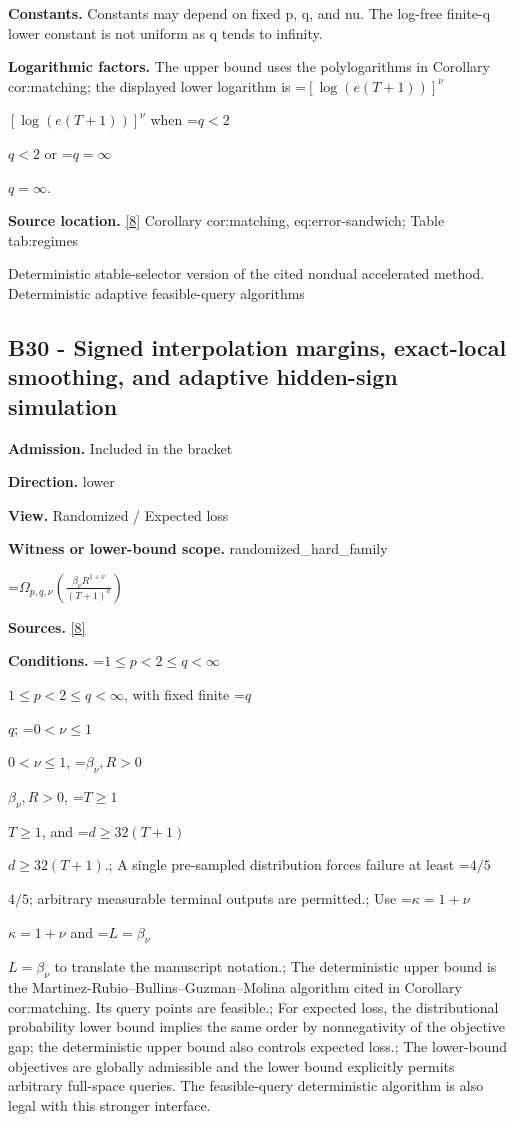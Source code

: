 \documentclass[10pt,a4paper]{article}
\newcommand{\AtlasMath}[1]{\par\begingroup\centering\setbox0=\hbox{$\displaystyle #1$}\ifdim\wd0>1.4\linewidth\typeout{ATLAS WIDE FORMULA: \the\wd0}\fi\ifdim\wd0>\linewidth\resizebox{\linewidth}{!}{\box0}\else\box0\fi\par\endgroup}
\newcommand{\AtlasInlineMath}[1]{\begingroup\setbox0=\hbox{$#1$}\ifdim\wd0>.4\linewidth\endgroup\AtlasMath{#1}\else\endgroup$#1$\fi}
\begin{document}
\textbf{Constants.} Constants may depend on fixed p, q, and nu. The log-free finite-q lower constant is not uniform as q tends to infinity.



\textbf{Logarithmic factors.} The upper bound uses the polylogarithms in Corollary cor:matching; the displayed lower logarithm is \AtlasInlineMath{[\log(e(T+1))]^\nu} when \AtlasInlineMath{q<2} or \AtlasInlineMath{q=\infty}.



\textbf{Source location.} \href{https://github.com/WU-Wendao/Colombo/blob/main/colombo_sensorium/Complexity_altas/data/sources/colombo/B1/manuscript.pdf}{[8]} Corollary cor:matching, eq:error-sandwich; Table tab:regimes



Deterministic stable-selector version of the cited nondual accelerated method. Deterministic adaptive feasible-query algorithms



\subsection{B30 - Signed interpolation margins, exact-local smoothing, and adaptive hidden-sign simulation}


\textbf{Admission.} Included in the bracket



\textbf{Direction.} lower



\textbf{View.} Randomized / Expected loss



\textbf{Witness or lower-bound scope.} randomized\_hard\_family



\AtlasMath{\Omega_{p,q,\nu}\!\left(\frac{\beta_\nu R^{1+\nu}}{(T+1)^a}\right)}


\textbf{Sources.} \href{https://github.com/WU-Wendao/Colombo/blob/main/colombo_sensorium/Complexity_altas/data/sources/colombo/B1/manuscript.pdf}{[8]}



\textbf{Conditions.} \AtlasInlineMath{1\le p<2\le q<\infty}, with fixed finite \AtlasInlineMath{q}; \AtlasInlineMath{0<\nu\le1}, \AtlasInlineMath{\beta_\nu,R>0}, \AtlasInlineMath{T\ge1}, and \AtlasInlineMath{d\ge32(T+1)}.; A single pre-sampled distribution forces failure at least \AtlasInlineMath{4/5}; arbitrary measurable terminal outputs are permitted.; Use \AtlasInlineMath{\kappa=1+\nu} and \AtlasInlineMath{L=\beta_\nu} to translate the manuscript notation.; The deterministic upper bound is the Martinez-Rubio--Bullins--Guzman--Molina algorithm cited in Corollary cor:matching. Its query points are feasible.; For expected loss, the distributional probability lower bound implies the same order by nonnegativity of the objective gap; the deterministic upper bound also controls expected loss.; The lower-bound objectives are globally admissible and the lower bound explicitly permits arbitrary full-space queries. The feasible-query deterministic algorithm is also legal with this stronger interface.
\end{document}
